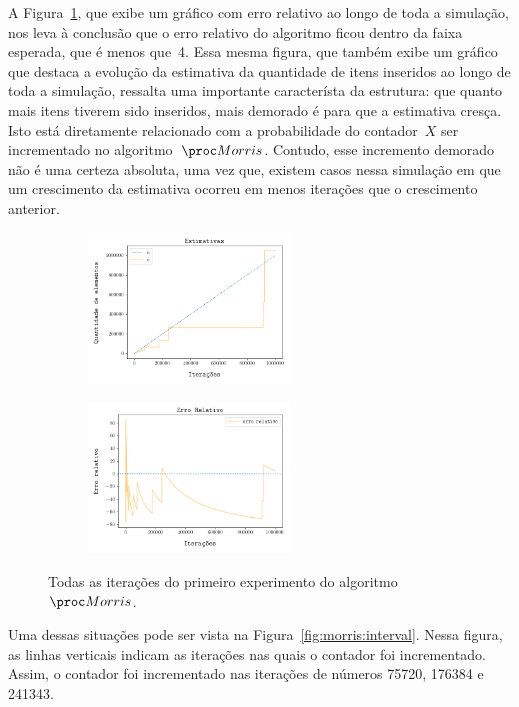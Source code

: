 A Figura~\ref{fig:morris:full}, que exibe um gráfico com erro relativo ao longo de toda a simulação, nos leva
à conclusão que o erro relativo do algoritmo ficou dentro da faixa esperada, que é menos que~4. Essa mesma figura, que 
também exibe um gráfico que destaca a evolução da estimativa da quantidade de itens inseridos ao longo de toda a 
simulação, ressalta uma importante característa da estrutura: que quanto mais itens tiverem sido inseridos, mais 
demorado é para que a estimativa cresça. Isto está diretamente relacionado com a probabilidade do contador~$X$ ser 
incrementado no algoritmo~$\Morris$. Contudo, esse incremento demorado não é uma certeza absoluta, uma vez que, existem 
casos nessa simulação em que um crescimento da estimativa ocorreu em menos iterações que o 
crescimento anterior. 

\begin{figure}
  \centering
  \begin{subfigure}{.5\textwidth}
    \centering
    \captionsetup{justification=centering}
    \includegraphics[width=\linewidth, height=4cm]{figuras/morris_full.png}
  \end{subfigure}%
  \begin{subfigure}{.5\textwidth}
    \centering
    \captionsetup{justification=centering}
    \includegraphics[width=\linewidth, height=4cm]{figuras/morris_erro_full.png}
  \end{subfigure}
  \caption{Todas as iterações do primeiro experimento do algoritmo~$\Morris$.}
  \label{fig:morris:full}
\end{figure}


Uma dessas situações pode ser vista na Figura~\ref{fig:morris:interval}. Nessa figura, as linhas verticais indicam as 
iterações nas quais o contador foi incrementado. Assim, o contador foi incrementado nas iterações de números 75720, 
176384 e 241343. 

